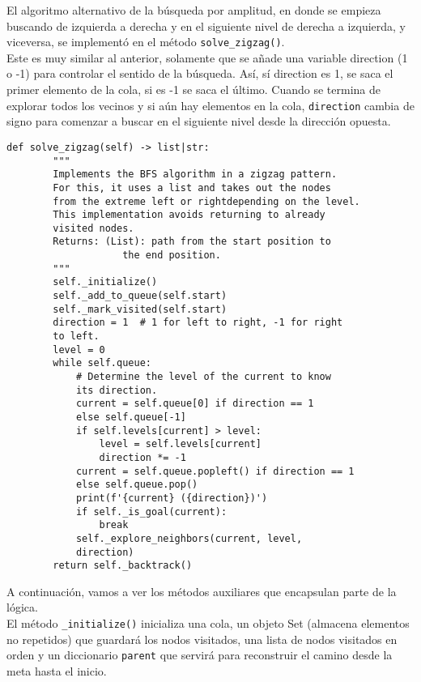 \clearpage
El algoritmo alternativo de la búsqueda por amplitud, en donde se empieza buscando de izquierda a derecha y en el siguiente nivel de derecha a izquierda, y viceversa, se implementó en el método \lstinline{solve_zigzag()}.
\\\newline
Este es muy similar al anterior, solamente que se añade una variable direction (1 o -1) para controlar el sentido de la búsqueda. Así, sí direction es 1, se saca el primer elemento de la cola, si es -1 se saca el último. Cuando se termina de explorar todos los vecinos y si aún hay elementos en la cola, \lstinline{direction} cambia de signo para comenzar a buscar en el siguiente nivel desde la dirección opuesta.\\
\begin{lstlisting}
def solve_zigzag(self) -> list|str:
        """
        Implements the BFS algorithm in a zigzag pattern. 
        For this, it uses a list and takes out the nodes 
        from the extreme left or rightdepending on the level.
        This implementation avoids returning to already
        visited nodes.
        Returns: (List): path from the start position to 
                    the end position.
        """
        self._initialize()
        self._add_to_queue(self.start)
        self._mark_visited(self.start)
        direction = 1  # 1 for left to right, -1 for right
        to left.
        level = 0
        while self.queue:
            # Determine the level of the current to know 
            its direction.
            current = self.queue[0] if direction == 1 
            else self.queue[-1]
            if self.levels[current] > level:
                level = self.levels[current]
                direction *= -1
            current = self.queue.popleft() if direction == 1 
            else self.queue.pop()
            print(f'{current} ({direction})')
            if self._is_goal(current):
                break
            self._explore_neighbors(current, level,
            direction)
        return self._backtrack()
\end{lstlisting}
\clearpage
A continuación, vamos a ver los métodos auxiliares que encapsulan parte de la lógica.\\\newline
El método \lstinline{_initialize()} inicializa una cola, un objeto Set (almacena elementos no repetidos) que guardará los nodos visitados, una lista de nodos visitados en orden y un diccionario \lstinline{parent} que servirá para reconstruir el camino desde la meta hasta el inicio.\\

